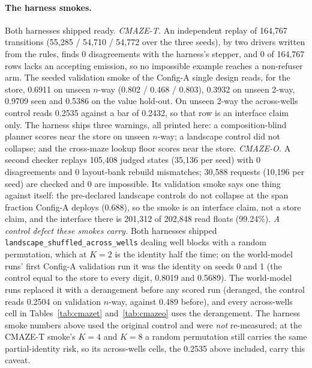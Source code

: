 \documentclass{article} %
\begin{document}
\paragraph{The harness smokes.} Both harnesses shipped ready.
\emph{CMAZE-T.} An independent replay of 164,767 transitions (55,285 / 54,710 / 54,772 over the
three seeds), by two drivers written from the rules, finds 0 disagreements with the harness's
stepper, and 0 of 164,767 rows lacks an accepting emission, so no impossible example reaches a
non-refuser arm. The seeded validation smoke of the Config-A single design reads, for the store,
0.6911 on unseen $n$-way (0.802 / 0.468 / 0.803), 0.3932 on unseen 2-way, 0.9709 seen and 0.5386
on the value hold-out. On unseen 2-way the across-wells control reads 0.2535 against a bar of
0.2432, so that row is an interface claim only. The harness ships three warnings, all printed here: a composition-blind planner scores near the
store on unseen $n$-way; a landscape control did not collapse; and the cross-maze lookup floor
scores near the store.
\emph{CMAZE-O.} A second checker replays 105,408 judged states (35,136 per seed) with 0
disagreements and 0 layout-bank rebuild mismatches; 30,588 requests (10,196 per seed) are checked
and 0 are impossible. Its validation smoke says one thing against itself: the pre-declared landscape
controls do not collapse at the span fraction Config-A deploys (0.688), so the smoke is an interface claim,
not a store claim, and the interface there is 201,312 of 202,848 read floats (99.24\%).
\emph{A control defect these smokes carry.} Both harnesses shipped
\texttt{landscape\_shuffled\_across\_wells} dealing well blocks with a random permutation, which at
$K=2$ is the identity half the time; on the world-model runs' first Config-A validation run it was
the identity on seeds 0 and 1 (the control equal to the store to every digit, 0.8019 and 0.5689).
The world-model runs replaced it with a derangement before any scored run (deranged, the control
reads 0.2504 on validation $n$-way, against 0.489 before), and every across-wells cell in
Tables~\ref{tab:cmazet} and~\ref{tab:cmazeo} uses the derangement. The harness smoke numbers above
used the original control and were \emph{not} re-measured; at the CMAZE-T smoke's $K=4$ and $K=8$ a
random permutation still carries the same partial-identity risk, so its across-wells cells,
the 0.2535 above included, carry this caveat.
\end{document}
